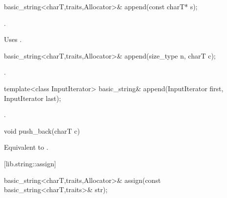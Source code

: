 %
%
\begin{itemdecl}
basic_string<charT,traits,Allocator>& append(const charT* s);
\end{itemdecl}

\begin{itemdescr}
\pnum
\returns
{}.

\pnum
\notes
Uses .
\end{itemdescr}

%
%
\begin{itemdecl}
basic_string<charT,traits,Allocator>&
  append(size_type n, charT c);
\end{itemdecl}

\begin{itemdescr}
\pnum
\returns
{}.
\end{itemdescr}

%
%
\begin{itemdecl}
template<class InputIterator>
  basic_string& append(InputIterator first, InputIterator last);
\end{itemdecl}

\begin{itemdescr}
\pnum
\returns
{}.
\end{itemdescr}

%
%
\begin{itemdecl}
void push_back(charT c)
\end{itemdecl}

\begin{itemdescr}
\pnum
\effects
Equivalent to
.
\end{itemdescr}

[lib.string::assign]{}

%
%
\begin{itemdecl}
basic_string<charT,traits,Allocator>&
  assign(const basic_string<charT,traits>& str);
\end{itemdecl}

